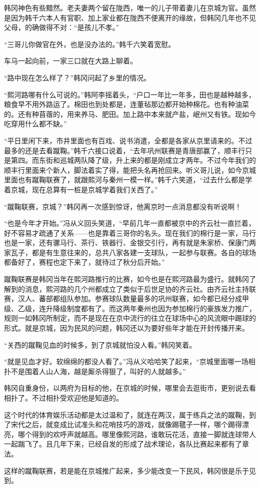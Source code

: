 韩冈神色有些黯然。老夫妻两个留在陇西，唯一的儿子带着妻儿在京城为官。虽然是因为韩千六本人有官职、加上家业都在陇西不便离开的缘故，但韩冈几年也不见父母，的确做得不对：“是孩儿不孝。”

“三哥儿你做官在外，也是没办法的。”韩千六笑着宽慰。

车马一起向前，一家三口就在大路上聊着。

“路中现在怎么样了？”韩冈问起了乡里的情况。

“熙河路哪有什么可说的。”韩阿李摇着头，“户口一年比一年多，田也是越种越多，粮食早不用外路运了。棉田也到处都是，连董毡那边都开始种棉花。也有种油菜的。还有种苜蓿的，用来养马、肥田。加上路中本来就产盐，岷州又有铁。现如今吃穿用什么都不缺。”

“平日里闲下来，市井里面也有百戏、说书消遣，全都是各家从京里请来的。不过最多的还是去看蹴鞠。”韩千六接口说着，“去年巩州联赛是青唐部赢了，顺丰行只是第四。而东街和巡城两队降了级，升上来的都是刚成立才两年。不过今年我们的顺丰行里面来个新人，脚法着实了得，能把头名再抢回来。听义哥儿说，如今京城里面也有蹴鞠联赛了，就跟熙河与秦州一模一样。”韩千六笑道，“过去什么都是学着京城，现在总算有一桩是京城学着我们关西了。”

“蹴鞠联赛，京城？”韩冈再一次感到惊讶，他离京时一点消息都没有听说啊！

“也是今年才开始。”冯从义回头笑道，“早前几年一直都被京中的齐云社一直拦着，好不容易才疏通了关系——也是靠着三哥你的名头。现在我们的棉行是一家，马行也是一家，还有骡马行、茶行、铁器行、金银交引行，再有就是朱家桥、保康门两家瓦子，都是有生意往来的，总共八家各建一支球队，一起参与联赛。各自的球场都备好了，赛程也定下来了，就待过了秋分后开始。”

蹴鞠联赛是韩冈当年在熙河路推行的比赛，如今也是在熙河路最为盛行。就韩冈了解到的消息，熙河路的几个州都成立了类似于后世足协的齐云社。由齐云社主持联赛，汉人、蕃部都组队参加。参赛球队数量最多的巩州联赛，如今都已经分成甲级、乙级，连升降级制度都有了。而这两年秦州也因为参加棉行的豪族发力推广，规则一如韩冈所制定，而不是现在在京中流行的往立在球场中心的风流眼中踢球的形式。就是京城，因为民风的问题，韩冈还以为要好些年才能在开封传播开来。

“关西的蹴鞠见血的时候多，到了京城就怕没人看。”韩冈笑着。

“就是见血才好。软绵绵的都没人看了。”冯从义哈哈笑了起来，“京城里面哪一场相扑不是围着人山人海，越是厮杀得狠了，叫好的人就越多。”

韩冈自重身份，以两府为目标的他，在京城的时候，哪里会去逛街市，更别说去看相扑了。不过相扑受欢迎他是知道的。

这个时代的体育娱乐活动都是太过温和了，就连在两汉，属于练兵之法的蹴鞠，到了宋代之后，就变成比试准头和花哨技巧的游戏，就像踢毽子一样，哪个踢得漂亮，哪个得到的欢呼声就越高。哪里像熙河路，谁敢玩花活，直接一脚就连球带人一起踹飞了。且几年下来，已经自发的形成了战术理论，各队比赛起来都有了章法。

这样的蹴鞠联赛，若是能在京城推广起来，多少能改变一下民风，韩冈很是乐于见到。


